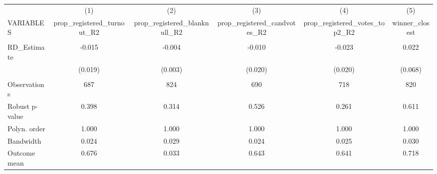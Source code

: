 \documentclass[]{article}
\begin{document}
\begin{tabular}{lccccc} \hline
 & (1) & (2) & (3) & (4) & (5) \\
VARIABLES & prop\_registered\_turnout\_R2 & prop\_registered\_blanknull\_R2 & prop\_registered\_candvotes\_R2 & prop\_registered\_votes\_top2\_R2 & winner\_closest \\ \hline
 &  &  &  &  &  \\
RD\_Estimate & -0.015 & -0.004 & -0.010 & -0.023 & 0.022 \\
 & (0.019) & (0.003) & (0.020) & (0.020) & (0.068) \\
 &  &  &  &  &  \\
Observations & 687 & 824 & 690 & 718 & 820 \\
Robust p-value & 0.398 & 0.314 & 0.526 & 0.261 & 0.611 \\
Polyn. order & 1.000 & 1.000 & 1.000 & 1.000 & 1.000 \\
Bandwidth & 0.024 & 0.029 & 0.024 & 0.025 & 0.030 \\
 Outcome mean & 0.676 & 0.033 & 0.643 & 0.641 & 0.718 \\ \hline
\end{tabular}
\end{document}
